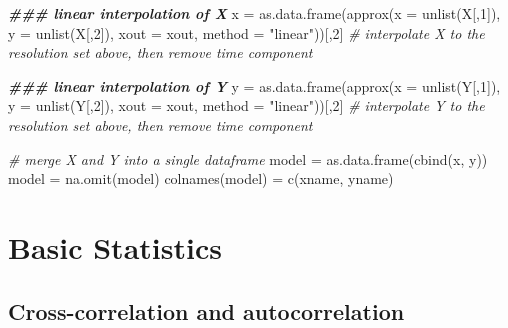 \documentclass[
]{article}
\newenvironment{Shaded}{\begin{snugshade}}{\end{snugshade}}
\newcommand{\AttributeTok}[1]{\textcolor[rgb]{0.77,0.63,0.00}{#1}}
\newcommand{\CommentTok}[1]{\textcolor[rgb]{0.56,0.35,0.01}{\textit{#1}}}
\newcommand{\DecValTok}[1]{\textcolor[rgb]{0.00,0.00,0.81}{#1}}
\newcommand{\DocumentationTok}[1]{\textcolor[rgb]{0.56,0.35,0.01}{\textbf{\textit{#1}}}}
\newcommand{\FunctionTok}[1]{\textcolor[rgb]{0.00,0.00,0.00}{#1}}
\newcommand{\NormalTok}[1]{#1}
\newcommand{\OtherTok}[1]{\textcolor[rgb]{0.56,0.35,0.01}{#1}}
\newcommand{\StringTok}[1]{\textcolor[rgb]{0.31,0.60,0.02}{#1}}
\begin{document}
\begin{Shaded}
\begin{Highlighting}[]
\DocumentationTok{\#\#\# linear interpolation of X}
\NormalTok{x }\OtherTok{=} \FunctionTok{as.data.frame}\NormalTok{(}\FunctionTok{approx}\NormalTok{(}\AttributeTok{x =} \FunctionTok{unlist}\NormalTok{(X[,}\DecValTok{1}\NormalTok{]), }\AttributeTok{y =} \FunctionTok{unlist}\NormalTok{(X[,}\DecValTok{2}\NormalTok{]), }\AttributeTok{xout =}\NormalTok{ xout, }\AttributeTok{method =} \StringTok{"linear"}\NormalTok{))[,}\DecValTok{2}\NormalTok{] }\CommentTok{\# interpolate X to the resolution set above, then remove time component}

\DocumentationTok{\#\#\# linear interpolation of Y}
\NormalTok{y }\OtherTok{=} \FunctionTok{as.data.frame}\NormalTok{(}\FunctionTok{approx}\NormalTok{(}\AttributeTok{x =} \FunctionTok{unlist}\NormalTok{(Y[,}\DecValTok{1}\NormalTok{]), }\AttributeTok{y =} \FunctionTok{unlist}\NormalTok{(Y[,}\DecValTok{2}\NormalTok{]), }\AttributeTok{xout =}\NormalTok{ xout, }\AttributeTok{method =} \StringTok{"linear"}\NormalTok{))[,}\DecValTok{2}\NormalTok{] }\CommentTok{\# interpolate Y to the resolution set above, then remove time component}

\CommentTok{\# merge X and Y into a single dataframe}
\NormalTok{model }\OtherTok{=} \FunctionTok{as.data.frame}\NormalTok{(}\FunctionTok{cbind}\NormalTok{(x, y))}
\NormalTok{model }\OtherTok{=} \FunctionTok{na.omit}\NormalTok{(model)}
\FunctionTok{colnames}\NormalTok{(model) }\OtherTok{=} \FunctionTok{c}\NormalTok{(xname, yname)}
\end{Highlighting}
\end{Shaded}

\hypertarget{basic-statistics}{%
\section{Basic Statistics}\label{basic-statistics}}

\hypertarget{cross-correlation-and-autocorrelation}{%
\subsection{Cross-correlation and
autocorrelation}\label{cross-correlation-and-autocorrelation}}
\end{document}
